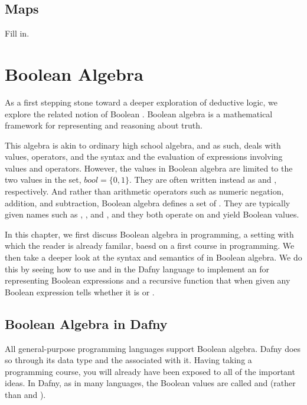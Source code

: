 \documentclass[letterpaper,10pt,english]{sphinxmanual}
\begin{document}
\section{Maps}
\label{\detokenize{08-relations:maps}}
Fill in.


\chapter{Boolean Algebra}
\label{\detokenize{09-boolean-algebra:boolean-algebra}}\label{\detokenize{09-boolean-algebra::doc}}
As a first stepping stone toward a deeper exploration of deductive
logic, we explore the related notion of Boolean . Boolean
algebra is a mathematical framework for representing and reasoning
about truth.

This algebra is akin to ordinary high school algebra, and as such,
deals with values, operators, and the syntax and the evaluation of
expressions involving values and operators.  However, the values in
Boolean algebra are limited to the two values in the set, \(bool
= \{ 0, 1\}\). They are often written instead as  and ,
respectively. And rather than arithmetic operators such as numeric
negation, addition, and subtraction, Boolean algebra defines a set of
. They are typically given names such as ,
, and , and they both operate on and yield Boolean values.

In this chapter, we first discuss Boolean algebra in programming, a
setting with which the reader is already familar, baesd on a first
course in programming. We then take a deeper look at the syntax and
semantics of  in Boolean algebra. We do this by seeing
how to use  and  in the
Dafny language to implement an  for representing
Boolean expressions and a recursive  function that when
given any Boolean expression tells whether it is  or .


\section{Boolean Algebra in Dafny}
\label{\detokenize{09-boolean-algebra:boolean-algebra-in-dafny}}
All general-purpose programming languages support Boolean
algebra. Dafny does so through its  data type and the
 associated with it. Having taking a programming course,
you will already have been exposed to all of the important ideas.
In Dafny, as in many languages, the Boolean values are called
 and  (rather than  and ).
\end{document}

